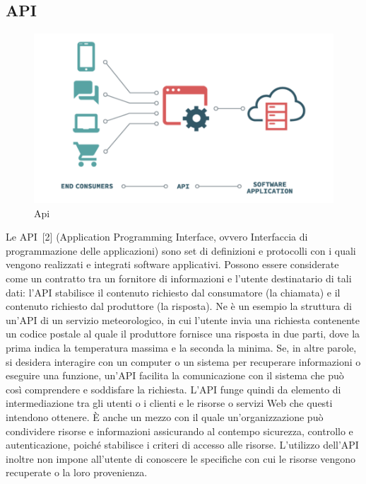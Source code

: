 \documentclass[12pt,a4paper]{article}
\begin{document}
\subsection{API}
\begin{figure}[H]
    \centering
    \includegraphics[width=.9\linewidth]{api.png}
    \caption{Api}
\end{figure}

Le API~[2] (Application Programming Interface, ovvero Interfaccia di programmazione delle applicazioni) sono set di definizioni e protocolli con i quali vengono realizzati e integrati software applicativi. Possono essere considerate come un contratto tra un fornitore di informazioni e l'utente destinatario di tali dati: l'API stabilisce il contenuto richiesto dal consumatore (la chiamata) e il contenuto richiesto dal produttore (la risposta). Ne è un esempio la struttura di un'API di un servizio meteorologico, in cui l'utente invia una richiesta contenente un codice postale al quale il produttore fornisce una risposta in due parti, dove la prima indica la temperatura massima e la seconda la minima.
\hfill \break \break
Se, in altre parole, si desidera interagire con un computer o un sistema per recuperare informazioni o eseguire una funzione, un'API facilita la comunicazione con il sistema che può così comprendere e soddisfare la richiesta.
L'API funge quindi da elemento di intermediazione tra gli utenti o i clienti e le risorse o servizi Web che questi intendono ottenere. È anche un mezzo con il quale un'organizzazione può condividere risorse e informazioni assicurando al contempo sicurezza, controllo e autenticazione, poiché stabilisce i criteri di accesso alle risorse.
%
L'utilizzo dell'API inoltre non impone all'utente di conoscere le specifiche con cui le risorse vengono recuperate o la loro provenienza.
\end{document}
